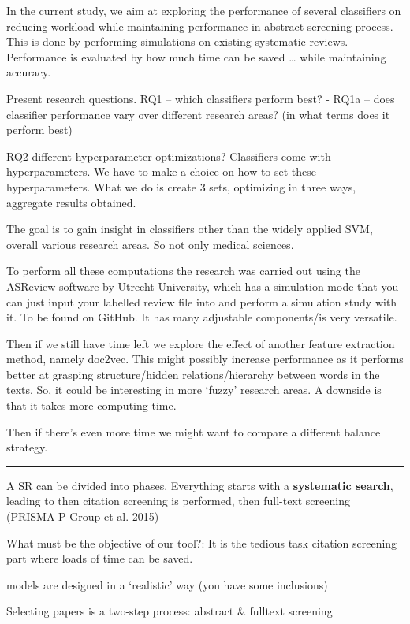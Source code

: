 \documentclass[
]{article}
\begin{document}
In the current study, we aim at exploring the performance of several
classifiers on reducing workload while maintaining performance in
abstract screening process. This is done by performing simulations on
existing systematic reviews. Performance is evaluated by how much time
can be saved \ldots{} while maintaining accuracy.

Present research questions. RQ1 -- which classifiers perform best? -
RQ1a -- does classifier performance vary over different research areas?
(in what terms does it perform best)

RQ2 different hyperparameter optimizations? Classifiers come with
hyperparameters. We have to make a choice on how to set these
hyperparameters. What we do is create 3 sets, optimizing in three ways,
aggregate results obtained.

The goal is to gain insight in classifiers other than the widely applied
SVM, overall various research areas. So not only medical sciences.

To perform all these computations the research was carried out using the
ASReview software by Utrecht University, which has a simulation mode
that you can just input your labelled review file into and perform a
simulation study with it. To be found on GitHub. It has many adjustable
components/is very versatile.

Then if we still have time left we explore the effect of another feature
extraction method, namely doc2vec. This might possibly increase
performance as it performs better at grasping structure/hidden
relations/hierarchy between words in the texts. So, it could be
interesting in more `fuzzy' research areas. A downside is that it takes
more computing time.

Then if there's even more time we might want to compare a different
balance strategy.

\begin{center}\rule{0.5\linewidth}{0.5pt}\end{center}

A SR can be divided into phases. Everything starts with a
\textbf{systematic search}, leading to then citation screening is
performed, then full-text screening (PRISMA-P Group et al. 2015)

What must be the objective of our tool?: It is the tedious task citation
screening part where loads of time can be saved.

models are designed in a `realistic' way (you have some inclusions)

Selecting papers is a two-step process: abstract \& fulltext screening
\end{document}
